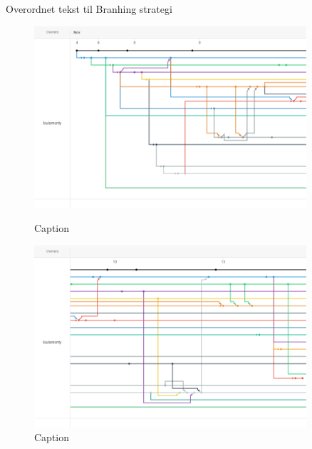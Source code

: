 \begin{flushleft}
    Overordnet tekst til Branhing strategi
    
\end{flushleft}
    
\begin{figure}
    \centering
    \includegraphics[width=0.9\textwidth]{Report/root/1.png}
    \caption{Caption}
    \includegraphics[width=0.9\textwidth]{Report/root/2.png}
    \caption{Caption}
\end{figure}
